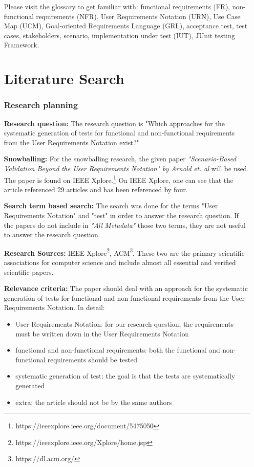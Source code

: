 Please visit the glossary to get familiar with: functional requirements (FR), non-functional requirements (NFR), User Requirements Notation (URN), Use Case Map (UCM), Goal-oriented Requirements Language (GRL), acceptance test, test cases, stakeholders, scenario, implementation under test (IUT), JUnit testing Framework.
\section{Literature Search}
\label{topic08:sectionLiteratur}

\subsubsection{Research planning} 

\textbf{Research question:} The research question is "Which approaches for the systematic generation of tests for functional and non-functional requirements from the User Requirements Notation exist?"

\textbf{Snowballing:} For the snowballing research, the given paper \textit{"Scenario-Based Validation Beyond the User Requirements Notation" by Arnold et. al} will be used. The paper is found on IEEE Xplore.\footnote{https://ieeexplore.ieee.org/document/5475050} On IEEE Xplore, one can see that the article referenced 29 articles and has been referenced by four. 

\textbf{Search term based search:} The search was done for the terms "User Requirements Notation" and "test" in order to answer the research question. If the papers do not include in \textit{"All Metadata"} those two terms, they are not useful to answer the research question.

\textbf{Research Sources:} IEEE Xplore\footnote{https://ieeexplore.ieee.org/Xplore/home.jsp}, ACM\footnote{https://dl.acm.org/}. These two are the primary scientific associations for computer science and include almost all essential and verified scientific papers.

\textbf{Relevance criteria:} The paper should deal with an approach for the systematic generation of tests for functional and non-functional requirements from the User Requirements Notation. In detail:
\begin{itemize}
	\itemsep-1em
	\item User Requirements Notation: for our research question, the requirements must be written down in the User Requirements Notation
	\item functional and non-functional requirements: both the functional and non-functional requirements should be tested 
	\item systematic generation of test: the goal is that the tests are systematically generated
	\item extra: the article should not be by the same authors
\end{itemize}

